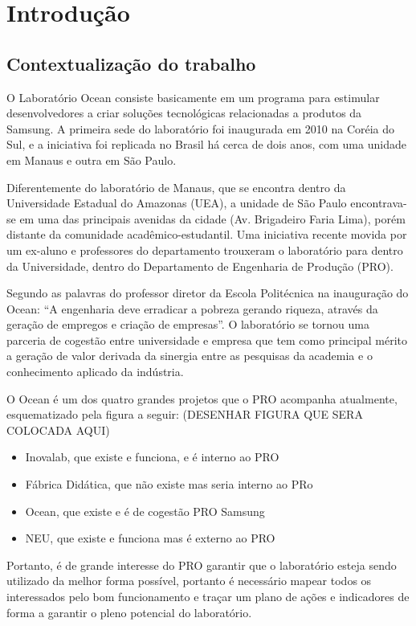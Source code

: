\chapter[Introdução]{Introdução}
\label{chap:introducao}
\section{Contextualização do trabalho}
\label{cha:contexto}

O Laboratório Ocean consiste basicamente em um programa para estimular desenvolvedores a criar soluções tecnológicas relacionadas a produtos da Samsung. A primeira sede do laboratório foi inaugurada em 2010 na Coréia do Sul, e a iniciativa foi replicada no Brasil há cerca de dois anos, com uma unidade em Manaus e outra em São Paulo.

Diferentemente do laboratório de Manaus, que se encontra dentro da Universidade Estadual do Amazonas (UEA), a unidade de São Paulo encontrava-se em uma das principais avenidas da cidade (Av. Brigadeiro Faria Lima), porém distante da comunidade acadêmico-estudantil. Uma iniciativa recente movida por um ex-aluno e professores do departamento trouxeram o laboratório para dentro da Universidade, dentro do Departamento de Engenharia de Produção (PRO).

Segundo as palavras do professor diretor da Escola Politécnica na inauguração do Ocean: “A engenharia deve erradicar a pobreza gerando riqueza, através da geração de empregos e criação de empresas”. O laboratório se tornou uma parceria de cogestão entre universidade e empresa que tem como principal mérito a geração de valor derivada da sinergia entre as pesquisas da academia e o conhecimento aplicado da indústria. 

O Ocean é um dos quatro grandes projetos que o PRO acompanha atualmente, esquematizado pela figura a seguir: (DESENHAR FIGURA QUE SERA COLOCADA AQUI)

\begin{itemize}
\item Inovalab, que existe e funciona, e é interno ao PRO
\item Fábrica Didática, que não existe mas seria interno ao PRo
\item Ocean, que existe e é de cogestão PRO Samsung
\item NEU, que existe e funciona mas é externo ao PRO
\end{itemize}

Portanto, é de grande interesse do PRO garantir que o laboratório esteja sendo utilizado da melhor forma possível, portanto é necessário mapear todos os interessados pelo bom funcionamento e traçar um plano de ações e indicadores de forma a garantir o pleno potencial do laboratório.

